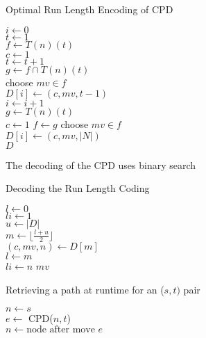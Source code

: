 \begin{algorithm}
  \caption{Optimal Run Length Encoding of CPD}
  \label{alg:rle}
  $i \gets 0$ \\
  $t \gets 1$ \\
  $f \gets T(n)(t)$ \\
  $c \gets 1$ \\
    { $t \gets t + 1$ \\
    $g \gets f \cap T(n)(t)$ \\
       { \textrm{choose} $mv \in f$ \\
         $D[i] \gets (c, mv, t-1)$ \\
         $i \gets i + 1$ \\
         $g \gets T(n)(t)$ \\
         $c \gets 1$ }
       $f \gets g$
    }
    \textrm{choose} $mv \in f$ \\
    $D[i] \gets (c, mv, |N|)$ \\
    \Return $D$
\end{algorithm}
         
The decoding of the CPD uses binary search

\begin{algorithm}
  \caption{Decoding the Run Length Coding}
  $l \gets 0$ \\
  $li \gets 1$ \\
  $u \gets |D|$  \\
        { $m \gets \lfloor \frac{l+u}{2} \rfloor$ \\
          $(c, mv, n) \gets D[m]$ \\
           {$l \gets m$ \\
            $li \gets n$} 
            {\Return $mv$}
        }
\end{algorithm}

\begin{algorithm}
  \caption{Retrieving a path at runtime for an ($s,t)$ pair}
  \label{alg:retrieve}
  $n \gets s$ \\
        {$e \gets$ \textsf{CPD}($n,t$) \\
         $n \gets \mbox{node after move~} e$
         }
\end{algorithm}


